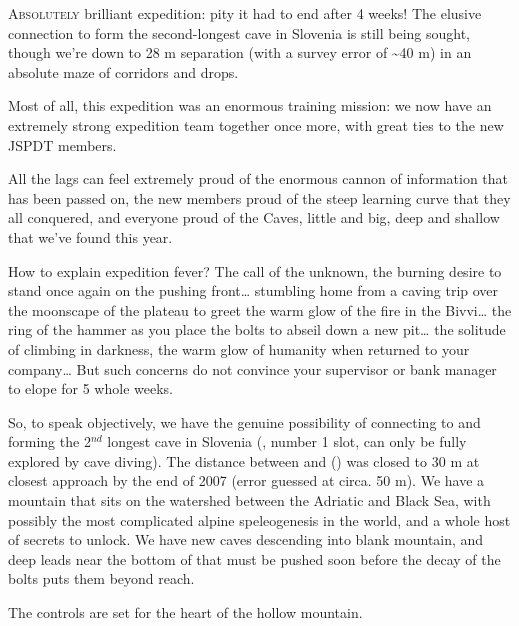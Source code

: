 \thispagestyle{endchapter}

\begin{tcolorbox}

\vspace{80pt}
	\lettrine{A}{bsolutely} brilliant expedition: pity it had to end after 4 weeks! The elusive connection to form the second-longest cave in Slovenia is still being sought, though we're down to 28 m separation (with a survey error of \textasciitilde 40 m) in an absolute maze of corridors and drops.
 
 Most of all, this expedition was an enormous training mission: we now have an extremely strong expedition team together once more, with great ties to the new JSPDT members.

All the lags can feel extremely proud of the enormous
cannon of information that has been passed on, the new members proud of the steep learning curve that they all conquered, and everyone proud of the Caves, little and big, deep and shallow that we've found this year.
 
    How to explain expedition fever? The call of the unknown, the burning desire to stand once again on the pushing front\ldots{} stumbling home from a caving trip over the moonscape of the plateau to greet the warm glow of the fire in the Bivvi\ldots{} the ring of the hammer as you place the bolts to abseil down a new pit\ldots{} the solitude of climbing in darkness, the warm glow of humanity when returned to your company\ldots{} But such concerns do not convince your supervisor or bank manager to elope for 5 whole weeks.

    So, to speak objectively, we have the genuine possibility of connecting  to  and forming the 2\(^{nd}\) longest cave in Slovenia (, number 1 slot, can only be fully explored by cave diving). The distance between  and  () was closed to 30 m at closest approach by the end of 2007 (error guessed at circa. 50 m). We have a mountain that sits on the watershed between the Adriatic and Black Sea, with possibly the most complicated alpine speleogenesis in the world, and a whole host of secrets to unlock. We have new caves descending into blank mountain, and deep leads near the bottom of  that must be pushed soon before the decay of the bolts puts them beyond reach.

    The controls are set for the heart of the hollow mountain.



\end{tcolorbox} 
